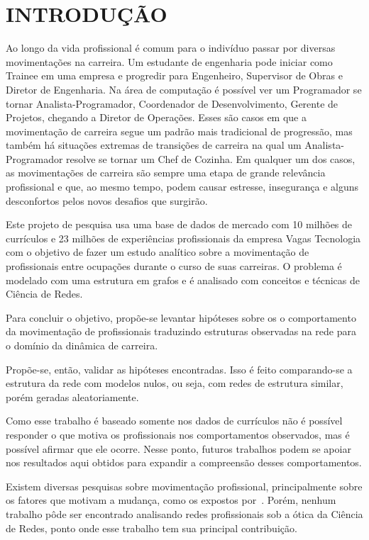 \documentclass[12pt,a4paper]{article}
\theoremstyle{hypo}
\begin{document}
\listoftodos[Notas]

\section{INTRODUÇÃO}

Ao longo da vida profissional é comum para o indivíduo passar por diversas movimentações na carreira. Um estudante de engenharia pode iniciar como Trainee em uma empresa e progredir para Engenheiro, Supervisor de Obras e Diretor de Engenharia. Na área de computação é possível ver um Programador se tornar Analista-Programador, Coordenador de Desenvolvimento, Gerente de Projetos, chegando a Diretor de Operações. Esses são casos em que a movimentação de carreira segue um padrão mais tradicional de progressão, mas também há situações extremas de transições de carreira na qual um Analista-Programador resolve se tornar um Chef de Cozinha. Em qualquer um dos casos, as movimentações de carreira são sempre uma etapa de grande relevância profissional e que, ao mesmo tempo, podem causar estresse, insegurança e alguns desconfortos pelos novos desafios que surgirão.

Este projeto de pesquisa usa uma base de dados de mercado com 10 milhões de currículos e 23 milhões de experiências profissionais da empresa Vagas Tecnologia com o objetivo de fazer um estudo analítico sobre a movimentação de profissionais entre ocupações durante o curso de suas carreiras. O problema é modelado com uma estrutura em grafos e é analisado com conceitos e técnicas de Ciência de Redes.

Para concluir o objetivo, propõe-se levantar hipóteses sobre os o comportamento da movimentação de profissionais traduzindo estruturas observadas na rede para o domínio da dinâmica de carreira.

Propõe-se, então, validar as hipóteses encontradas. Isso é feito comparando-se a estrutura da rede com modelos nulos, ou seja, com redes de estrutura similar, porém geradas aleatoriamente.

Como esse trabalho é baseado somente nos dados de currículos não é possível responder o que motiva os profissionais nos comportamentos observados, mas é possível afirmar que ele ocorre. Nesse ponto, futuros trabalhos podem se apoiar nos resultados aqui obtidos para expandir a compreensão desses comportamentos.

Existem diversas pesquisas sobre movimentação profissional, principalmente sobre os fatores que motivam a mudança, como os expostos por~. Porém, nenhum trabalho pôde ser encontrado analisando redes profissionais sob a ótica da Ciência de Redes, ponto onde esse trabalho tem sua principal contribuição.
\end{document}
